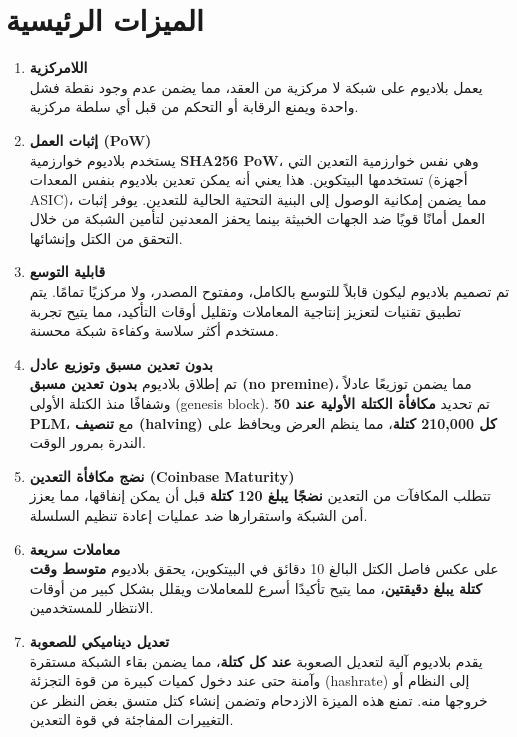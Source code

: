 \documentclass[11pt,a4paper]{article}
\begin{document}
\section{الميزات الرئيسية}
\begin{enumerate}
    \item \textbf{اللامركزية} \\ 
    يعمل بلاديوم على شبكة لا مركزية من العقد، مما يضمن عدم وجود نقطة فشل واحدة ويمنع الرقابة أو التحكم من قبل أي سلطة مركزية.

    \item \textbf{إثبات العمل (PoW)} \\ 
    يستخدم بلاديوم خوارزمية \textbf{SHA256 PoW}، وهي نفس خوارزمية التعدين التي تستخدمها البيتكوين. هذا يعني أنه يمكن تعدين بلاديوم بنفس المعدات (أجهزة ASIC)، مما يضمن إمكانية الوصول إلى البنية التحتية الحالية للتعدين. يوفر إثبات العمل أمانًا قويًا ضد الجهات الخبيثة بينما يحفز المعدنين لتأمين الشبكة من خلال التحقق من الكتل وإنشائها.

    \item \textbf{قابلية التوسع} \\ 
    تم تصميم بلاديوم ليكون قابلاً للتوسع بالكامل، ومفتوح المصدر، ولا مركزيًا تمامًا. يتم تطبيق تقنيات لتعزيز إنتاجية المعاملات وتقليل أوقات التأكيد، مما يتيح تجربة مستخدم أكثر سلاسة وكفاءة شبكة محسنة.

    \item \textbf{بدون تعدين مسبق وتوزيع عادل} \\ 
    تم إطلاق بلاديوم \textbf{بدون تعدين مسبق (no premine)}، مما يضمن توزيعًا عادلاً وشفافًا منذ الكتلة الأولى (genesis block). تم تحديد \textbf{مكافأة الكتلة الأولية عند 50 PLM}، مع \textbf{تنصيف (halving) كل 210,000 كتلة}، مما ينظم العرض ويحافظ على الندرة بمرور الوقت.

    \item \textbf{نضج مكافأة التعدين (Coinbase Maturity)} \\ 
    تتطلب المكافآت من التعدين \textbf{نضجًا يبلغ 120 كتلة} قبل أن يمكن إنفاقها، مما يعزز أمن الشبكة واستقرارها ضد عمليات إعادة تنظيم السلسلة.

    \item \textbf{معاملات سريعة} \\ 
    على عكس فاصل الكتل البالغ 10 دقائق في البيتكوين، يحقق بلاديوم \textbf{متوسط وقت كتلة يبلغ دقيقتين}، مما يتيح تأكيدًا أسرع للمعاملات ويقلل بشكل كبير من أوقات الانتظار للمستخدمين.

    \item \textbf{تعديل ديناميكي للصعوبة} \\ 
    يقدم بلاديوم آلية لتعديل الصعوبة \textbf{عند كل كتلة}، مما يضمن بقاء الشبكة مستقرة وآمنة حتى عند دخول كميات كبيرة من قوة التجزئة (hashrate) إلى النظام أو خروجها منه. تمنع هذه الميزة الازدحام وتضمن إنشاء كتل متسق بغض النظر عن التغييرات المفاجئة في قوة التعدين.
\end{enumerate}
\end{document}
